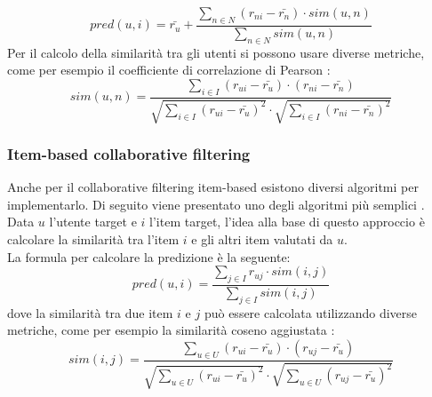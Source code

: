 \begin{equation}
    pred(u,i) = \bar{r_u} + \frac{\sum_{n \in N} (r_{ni} - \bar{r_n}) \cdot sim(u,n)}{\sum_{n \in N} sim(u,n)}
\end{equation}
Per il calcolo della similarità tra gli utenti si possono usare diverse metriche, come per esempio il coefficiente di correlazione di Pearson \cite{Pearson}:
\begin{equation}
    sim(u,n) = \frac{\sum_{i \in I} (r_{ui} - \bar{r_u}) \cdot (r_{ni} - \bar{r_n})}{\sqrt{\sum_{i \in I} (r_{ui} - \bar{r_u})^2} \cdot \sqrt{\sum_{i \in I} (r_{ni} - \bar{r_n})^2}}
\end{equation}

\subsubsection{Item-based collaborative filtering}

Anche per il collaborative filtering item-based esistono diversi algoritmi per implementarlo. Di seguito viene presentato uno degli algoritmi più semplici \cite{ItemBased}.\\
Data $u$ l'utente target e $i$ l'item target, l'idea alla base di questo approccio è calcolare la similarità tra l'item $i$ e gli altri item valutati da $u$.\\
La formula per calcolare la predizione è la seguente:
\begin{equation}
    pred(u,i) = \frac{\sum_{j \in I} r_{uj} \cdot sim(i,j)}{\sum_{j \in I} sim(i,j)}
\end{equation}
dove la similarità tra due item $i$ e $j$ può essere calcolata utilizzando diverse metriche, come per esempio la similarità coseno aggiustata \cite{CosineAdjustedSim}:
\begin{equation}
    sim(i,j) = \frac{\sum_{u \in U} (r_{ui} - \bar{r_u}) \cdot (r_{uj} - \bar{r_u})}{\sqrt{\sum_{u \in U} (r_{ui} - \bar{r_u})^2} \cdot \sqrt{\sum_{u \in U} (r_{uj} - \bar{r_u})^2}}
\end{equation}

